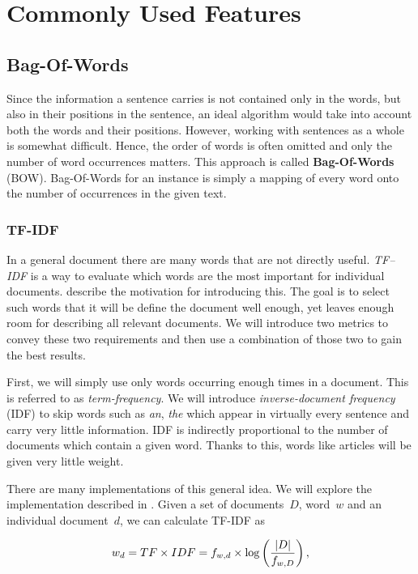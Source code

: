 \section{Commonly Used Features}

\subsection{Bag-Of-Words}

Since the information a sentence carries is not contained only in the words, but also in their positions in the sentence, an ideal algorithm would take into account both the words and their positions.
However, working with sentences as a whole is somewhat difficult. Hence, the order of words is often omitted and only the number of word occurrences matters.
This approach is called {\bf Bag-Of-Words} (BOW). Bag-Of-Words for an instance is simply a mapping of every word onto the number of occurrences in the given text.

\subsubsection{TF-IDF}

In a general document there are many words that are not directly useful.
{\it TF--IDF} is a way to evaluate which words are the most important for individual documents.  
\citet{SalBuc88} describe the motivation for introducing this.
The goal is to select such words that it will be define the document well enough, yet leaves enough room for describing all relevant documents.
We will introduce two metrics to convey these two requirements and then use a combination of those two to gain the best results.

First, we will simply use only words occurring enough times in a document. This is referred to as {\it term-frequency}.
We will introduce {\it inverse-document frequency} (IDF) to skip words such as {\it an}, {\it the} which appear in virtually every sentence and carry very little information.
IDF is indirectly proportional to the number of documents which contain a given word.
Thanks to this, words like articles will be given very little weight.

There are many implementations of this general idea. We will explore the implementation described in \citet{Ramos03}. Given a set of documents~$D$, word~$w$ and an individual document~$d$,
we can calculate TF-IDF as

\[
	w_d = TF \times IDF = f_{w, d} \times \log \left( {\left|{D}\right|\over f_{w,D}}  \right),
\]


